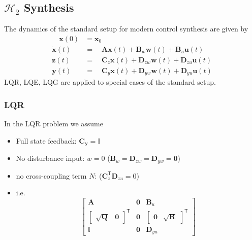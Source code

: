 \subsection[H2 Synthesis]{$\mathcal{H}_2$ Synthesis}\label{h2_synth}
The dynamics of the standard setup for modern control synthesis are given by
\begin{align*}
    \quad \mathbf{x}(0) & =\mathbf{x}_{0}                                                                              \\
    \dot{\mathbf{x}}(t) & =\quad \mathbf{A}\mathbf{x}(t)+\mathbf{B}_{w}\mathbf{w}(t)+\mathbf{B}_{u}\mathbf{u}(t)       \\
    \mathbf{z}(t)       & =\quad \mathbf{C}_{z}\mathbf{x}(t)+\mathbf{D}_{zw}\mathbf{w}(t)+\mathbf{D}_{zu}\mathbf{u}(t) \\
    \mathbf{y}(t)       & =\quad \mathbf{C}_{y}\mathbf{x}(t)+\mathbf{D}_{yw}\mathbf{w}(t)+\mathbf{D}_{yu}\mathbf{u}(t)
\end{align*}
LQR, LQE, LQG are applied to special cases of the standard setup.
\subsubsection{LQR}


In the LQR problem we assume
\begin{itemize}
    \item Full state feedback: $\mathbf{C_y}=\mathbf{\mathbb{I}}$
    \item No disturbance input: $w=0$ ($\mathbf{B}_w=\mathbf{D}_{zw}=\mathbf{D}_{yw}=\mathbf{0}$)
    \item no cross-coupling term $N$: ($\mathbf{C}_z^{\mathsf{T}}\mathbf{D}_{zu}=0$)
    \item i.e.
          \noindent\begin{equation*}
              \begin{bmatrix}
                  \mathbf{A}                                                                  & \mathbf{0} & \mathbf{B}_u                                                               \\
                  \begin{bmatrix}\sqrt{\mathbf{Q}} & \mathbf{0} \end{bmatrix}^{\mathsf{T}} & \mathbf{0} & \begin{bmatrix}\mathbf{0} & \sqrt{\mathbf{R}}\end{bmatrix}^{\mathsf{T}} \\
                  \mathbb{I}                                                                  & \mathbf{0} & \mathbf{D}_{yu}
              \end{bmatrix}
          \end{equation*}
\end{itemize}

